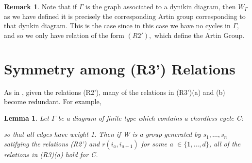 \documentclass[11pt]{amsart}
\newtheorem{lem}[thm]{Lemma}
\theoremstyle{definition}
\newtheorem{rem}[thm]{Remark}
\begin{document}
\begin{rem}
Note that if $\Gamma$ is the graph associated to a dynikin diagram, then $W_\Gamma$ as we have defined it is precisely the corresponding Artin group corresponding to that dynkin diagram. This is the case since in this case we have no cycles in $\Gamma,$ and so we only have relation of the form $(R2'),$ which define the Artin Group.
\end{rem}

\section{Symmetry among (R3') Relations}
\label{sec:one_relation}

As in \cite{BM13}, given the relations (R2'), many of the relations in (R3')(a) and (b) become redundant. For example,

\begin{lem}
Let $\Gamma$ be a diagram of finite type which contains a chordless cycle C:
so that all edges have weight 1. Then if W is a group generated by $s_{1}, \dots, s_{n}$ satifying the relations (R2') and $r(i_{a}, i_{a+1})$ for some a $\in \{1, \dots, d\}$, all of the relations in (R3)(a) hold for C.
\end{lem}
\end{document}
